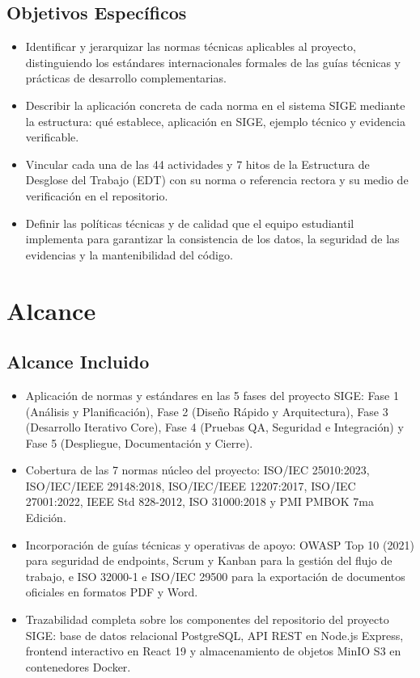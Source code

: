 \documentclass[12pt,a4paper]{article}
\begin{document}
\subsection{Objetivos Específicos}
\begin{itemize}[leftmargin=1.5em, itemsep=2pt]
    \item Identificar y jerarquizar las normas técnicas aplicables al proyecto, distinguiendo los estándares internacionales formales de las guías técnicas y prácticas de desarrollo complementarias.
    \item Describir la aplicación concreta de cada norma en el sistema SIGE mediante la estructura: qué establece, aplicación en SIGE, ejemplo técnico y evidencia verificable.
    \item Vincular cada una de las 44 actividades y 7 hitos de la Estructura de Desglose del Trabajo (EDT) con su norma o referencia rectora y su medio de verificación en el repositorio.
    \item Definir las políticas técnicas y de calidad que el equipo estudiantil implementa para garantizar la consistencia de los datos, la seguridad de las evidencias y la mantenibilidad del código.
\end{itemize}

\section{Alcance}

\subsection{Alcance Incluido}
\begin{itemize}[leftmargin=1.5em, itemsep=2pt]
    \item Aplicación de normas y estándares en las 5 fases del proyecto SIGE: Fase 1 (Análisis y Planificación), Fase 2 (Diseño Rápido y Arquitectura), Fase 3 (Desarrollo Iterativo Core), Fase 4 (Pruebas QA, Seguridad e Integración) y Fase 5 (Despliegue, Documentación y Cierre).
    \item Cobertura de las 7 normas núcleo del proyecto: ISO/IEC 25010:2023, ISO/IEC/IEEE 29148:2018, ISO/IEC/IEEE 12207:2017, ISO/IEC 27001:2022, IEEE Std 828-2012, ISO 31000:2018 y PMI PMBOK 7ma Edición.
    \item Incorporación de guías técnicas y operativas de apoyo: OWASP Top 10 (2021) para seguridad de endpoints, Scrum y Kanban para la gestión del flujo de trabajo, e ISO 32000-1 e ISO/IEC 29500 para la exportación de documentos oficiales en formatos PDF y Word.
    \item Trazabilidad completa sobre los componentes del repositorio del proyecto SIGE: base de datos relacional PostgreSQL, API REST en Node.js Express, frontend interactivo en React 19 y almacenamiento de objetos MinIO S3 en contenedores Docker.
\end{itemize}
\end{document}
